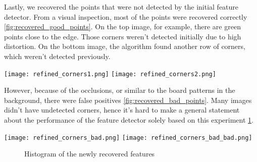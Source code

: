 \begin{minipage}[t]{0.3\linewidth}
	Lastly, we recovered the points that were not detected by the initial feature
	detector.
	From a visual inspection, most of the points were recovered correctly
	\cref{fig:recovered_good_points}.
	On the top image, for example, there are green points close to the edge.
	Those corners weren't detected initially due to high distortion. On the bottom
	image, the algorithm found another row of corners, which weren't detected previously.
\end{minipage}
\hfill
\begin{minipage}[t]{0.6\linewidth}
	\texttt{[image: refined\_corners1.png]}
	\texttt{[image: refined\_corners2.png]}

	\label{fig:recovered_good_points}
\end{minipage}

\begin{minipage}[t]{0.3\linewidth}
	However,
	because of the occlusions, or similar to the board patterns in the background,
	there were false positives \cref{fig:recovered_bad_points}. Many images didn't
	have undetected corners, hence it's hard to make a general statement about the
	performance of the feature detector solely based on this experiment
	\cref{fig:recovered_points_histogram}.
\end{minipage}
\hfill
\begin{minipage}[t]{0.6\linewidth}
	\texttt{[image: refined\_corners\_bad.png]}
	\texttt{[image: refined\_corners\_bad\_bad.png]}
	\label{fig:recovered_bad_points}
\end{minipage}

\begin{figure}[h]
	\caption{Histogram of the newly recovered features}
	\label{fig:recovered_points_histogram}
\end{figure}


